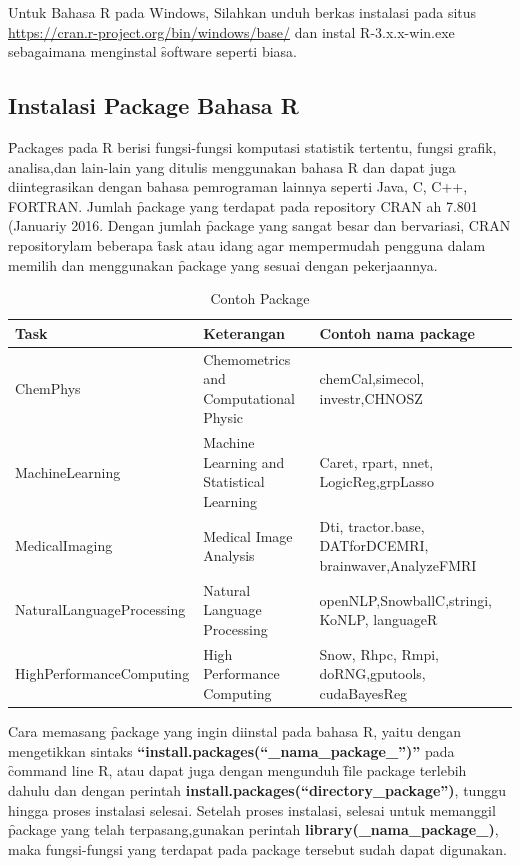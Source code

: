 Untuk Bahasa R pada Windows, Silahkan unduh berkas instalasi pada situs \url{https://cran.r-project.org/bin/windows/base/} dan instal R-3.x.x-win.exe sebagaimana menginstal \f{software} seperti biasa.

\subsection{Instalasi Package Bahasa R}
\f{Packages} pada R berisi fungsi-fungsi komputasi statistik tertentu, fungsi grafik, analisa,dan lain-lain yang ditulis menggunakan bahasa R dan dapat juga diintegrasikan dengan bahasa pemrograman lainnya seperti Java, C, C++, FORTRAN. Jumlah \f{package} yang terdapat pada repository CRAN ah 7.801 (Januariy 2016.  Dengan jumlah \f{package} yang sangat besar dan bervariasi, CRAN repositorylam beberapa \f{task} atau idang agar mempermudah pengguna dalam memilih dan menggunakan \f{package} yang sesuai dengan pekerjaannya.

\begin{table}
\caption{Contoh Package}
\label{tab:contoh_package}
\begin{tabular}{|L{4cm}|L{5cm}|L{5cm}|}
 \hline Task & Keterangan & Contoh nama package \\ 
\hline ChemPhys & Chemometrics and Computational Physic
 & chemCal,simecol, investr,CHNOSZ \\ 
\hline MachineLearning & Machine Learning and Statistical Learning & Caret, rpart, nnet, LogicReg,grpLasso \\ 
\hline MedicalImaging & Medical Image Analysis
 & Dti, tractor.base, DATforDCEMRI, brainwaver,AnalyzeFMRI \\ 
\hline NaturalLanguageProcessing & Natural Language Processing & openNLP,SnowballC,stringi, KoNLP, languageR \\ 
\hline HighPerformanceComputing & High Performance Computing
 & Snow, Rhpc, Rmpi, doRNG,gputools, cudaBayesReg \\ 
\hline 
\end{tabular} 
\end{table}

Cara memasang \f{package} yang ingin diinstal pada bahasa R, yaitu dengan mengetikkan sintaks \textbf{\textquotedblleft install.packages(\textquotedblleft \_nama\_package\_\textquotedblright )\textquotedblright} pada \f{command line} R, atau dapat juga dengan mengunduh \f{file package} terlebih dahulu dan dengan perintah \textbf{install.packages(\textquotedblleft directory\_package\textquotedblright )}, tunggu hingga proses instalasi selesai. Setelah proses instalasi, selesai untuk memanggil \f{package} yang telah terpasang,gunakan perintah \textbf{library(\_nama\_package\_)}, maka fungsi-fungsi yang terdapat pada package tersebut sudah dapat digunakan.

